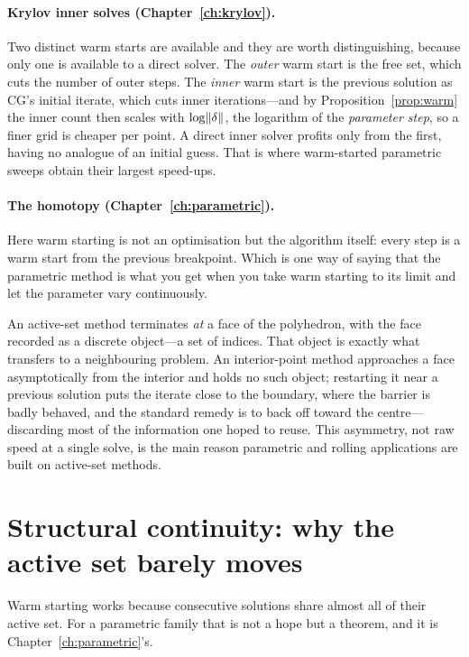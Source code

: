 \paragraph{Krylov inner solves (Chapter~\ref{ch:krylov}).} Two distinct warm starts are
available and they are worth distinguishing, because only one is available to a direct
solver. The \emph{outer} warm start is the free set, which cuts the number of outer
steps. The \emph{inner} warm start is the previous solution as CG's initial iterate,
which cuts inner iterations---and by Proposition~\ref{prop:warm} the inner count then
scales with $\log\lVert \delta \rVert$, the logarithm of the \emph{parameter step}, so a finer
grid is cheaper per point. A direct inner solver profits only from the first, having no
analogue of an initial guess. That is where warm-started parametric sweeps obtain their
largest speed-ups.

\paragraph{The homotopy (Chapter~\ref{ch:parametric}).} Here warm starting is not an
optimisation but the algorithm itself: every step is a warm start from the previous
breakpoint. Which is one way of saying that the parametric method is what you get when
you take warm starting to its limit and let the parameter vary continuously.

\begin{remark}
An active-set method terminates \emph{at} a face of the polyhedron, with the face
recorded as a discrete object---a set of indices. That object is exactly what transfers
to a neighbouring problem. An interior-point method approaches a face asymptotically
from the interior and holds no such object; restarting it near a previous solution puts
the iterate close to the boundary, where the barrier is badly behaved, and the standard
remedy is to back off toward the centre---discarding most of the information one hoped
to reuse. This asymmetry, not raw speed at a single solve, is the main reason
parametric and rolling applications are built on active-set methods.
\end{remark}

\section{Structural continuity: why the active set barely moves}

Warm starting works because consecutive solutions share almost all of their active set.
For a parametric family that is not a hope but a theorem, and it is
Chapter~\ref{ch:parametric}'s.

